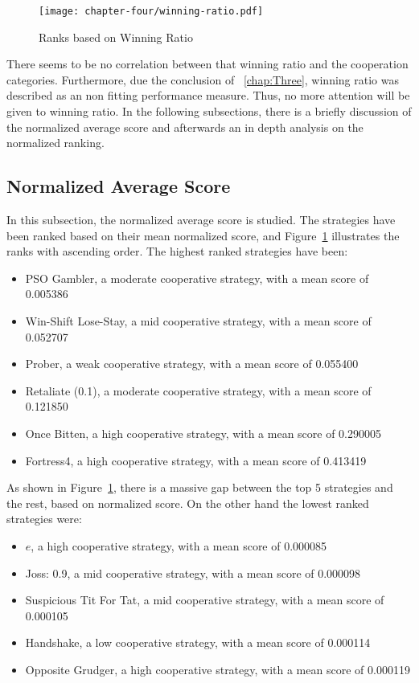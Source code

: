 \begin{figure}[H]
	\texttt{[image: chapter-four/winning-ratio.pdf]}
	\caption{Ranks based on Winning Ratio}
	\label{fig:wining-second-gen}
\end{figure}

There seems to be no correlation between that winning ratio and the cooperation
categories. Furthermore, due the conclusion of ~\autoref{chap:Three}, winning ratio was described as
an non fitting performance measure. Thus, no more attention will be given to
winning ratio. In the following subsections, there is a briefly discussion of the
normalized average score and afterwards an in depth analysis on the normalized
ranking.

\subsection{Normalized Average Score}
\label{sub:chap-four-normalized-score}
In this subsection, the normalized average score is studied. The strategies
have been ranked based on their mean normalized score, and Figure~\ref{fig:wining-second-gen} illustrates
the ranks with ascending order. The highest ranked strategies have been:

\begin{itemize}
	\item PSO Gambler, a moderate cooperative strategy, with a mean score of 0.005386
	\item Win-Shift Lose-Stay, a mid cooperative strategy, with a mean score of 0.052707
	\item Prober, a weak cooperative strategy, with a mean score of 0.055400
	\item Retaliate (0.1), a moderate cooperative strategy, with a mean score of 0.121850
	\item Once Bitten, a high cooperative strategy, with a mean score of 0.290005
	\item Fortress4, a high cooperative strategy, with a mean score of 0.413419
\end{itemize}

As shown in Figure~\ref{fig:wining-second-gen}, there is a massive gap between
the top 5 strategies and the rest, based on normalized score. On the other hand
the lowest ranked strategies were:

\begin{itemize}
	\item $e$, a high cooperative strategy, with a mean score of 0.000085
	\item Joss: 0.9, a mid cooperative strategy, with a mean score of 0.000098
	\item Suspicious Tit For Tat, a mid cooperative strategy, with a mean score of 0.000105
	\item Handshake, a low cooperative strategy, with a mean score of 0.000114
	\item Opposite Grudger, a high cooperative strategy, with a mean score of 0.000119
\end{itemize}

